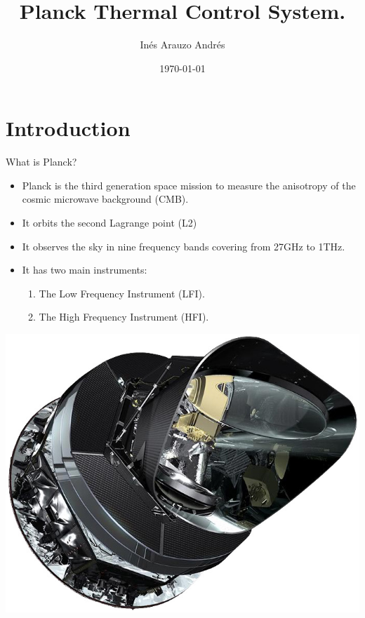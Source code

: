 \documentclass{cubeamer}
\title{Planck Thermal Control System.}
\author[Inés Arauzo Andres]{Inés Arauzo Andrés}
\date{\today} %
\institute[UPM]{Heat transfer and thermal control \\

\footnotesize{MUSE  IDR-UPM-ETSIAE}}
\begin{document}
\maketitle

\cutoc

\section{Introduction}

\begin{frame}{What is Planck?}
    \begin{minipage}{0.65\textwidth}
    \begin{itemize}
        \item Planck is the third generation space mission to measure the anisotropy of the cosmic microwave background (CMB). 
        \item It orbits the second Lagrange point (L2)
        \item It observes the sky in nine frequency bands covering from 27GHz to 1THz.
        \item It has two main instruments:
        \begin{enumerate}
            \item The Low Frequency Instrument (LFI).
            \item The High Frequency Instrument (HFI).
        \end{enumerate}
    \end{itemize}
    \end{minipage}
    \begin{minipage}{0.3\textwidth}
    \includegraphics[width=0.9\linewidth]{Figures/Planck1.jpg} \\

\end{minipage}
\end{frame}
\end{document}
